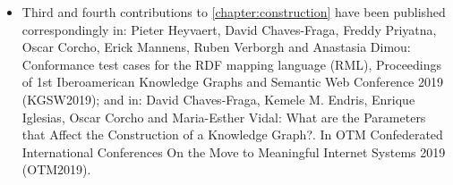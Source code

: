 \begin{itemize}
    \item Third and fourth contributions to \ref{chapter:construction} have been  published correspondingly in: Pieter Heyvaert, David Chaves-Fraga, Freddy Priyatna, Oscar Corcho, Erick Mannens, Ruben Verborgh and Anastasia Dimou: Conformance test cases for the RDF mapping language (RML), Proceedings of 1st Iberoamerican Knowledge Graphs and Semantic Web Conference 2019 (KGSW2019); and in: David Chaves-Fraga, Kemele M. Endris, Enrique Iglesias, Oscar Corcho and Maria-Esther Vidal: What are the Parameters that Affect the Construction of a Knowledge Graph?. In OTM Confederated International Conferences On the Move to Meaningful Internet Systems 2019 (OTM2019).
\end{itemize}



